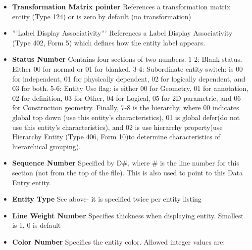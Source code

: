 \begin{itemize}
\itemsep1pt\parskip0pt
\item
  \textbf{Transformation Matrix pointer} References a transformation
  matrix entity (Type 124) or is zero by default (no transformation)
\item
  '''Label Display Associativity''' References a Label Display
  Associativity (Type 402, Form 5) which defines how the entity label
  appears.
\item
  \textbf{Status Number} Contains four sections of two numbers. 1-2:
  Blank status. Either 00 for normal or 01 for blanked. 3-4: Subordinate
  entity switch: is 00 for independent, 01 for physically dependent, 02
  for logically dependent, and 03 for both. 5-6: Entity Use flag: is
  either 00 for Geometry, 01 for annotation, 02 for definition, 03 for
  Other, 04 for Logical, 05 for 2D parametric, and 06 for Construction
  geometry. Finally, 7-8 is the hierarchy, where 00 indicates global top
  down (use this entity's characteristics), 01 is global defer(do not
  use this entity's characteristics), and 02 is use hierarchy
  property(use Hierarchy Entity (Type 406, Form 10)to determine
  characteristics of hierarchical grouping).
\item
  \textbf{Sequence Number} Specified by D\#, where \# is the line number
  for this section (not from the top of the file). This is also used to
  point to this Data Entry entity.
\item
  \textbf{Entity Type} See above- it is specified twice per entity
  listing
\item
  \textbf{Line Weight Number} Specifies thickness when displaying
  entity. Smallest is 1, 0 is default
\item
  \textbf{Color Number} Specifies the entity color. Allowed integer
  values are:


\end{itemize}
